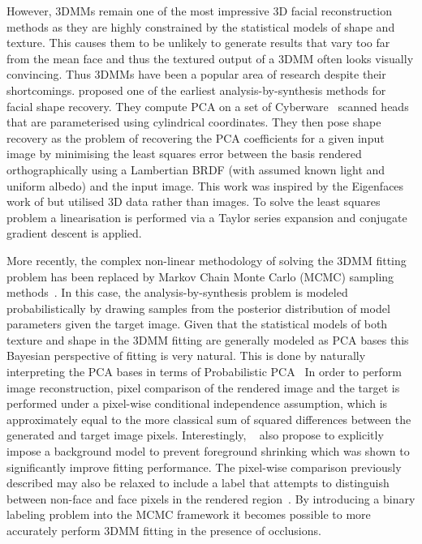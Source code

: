 However, 3DMMs remain one of the most impressive 3D facial reconstruction
methods as they are highly constrained by the statistical models
of shape and texture. This causes them to be unlikely to generate results
that vary too far from the mean face and thus the textured output of a 3DMM
often looks visually convincing. Thus 3DMMs have been a popular area of
research despite their shortcomings.
\cite{atick1996statistical} proposed one of the earliest analysis-by-synthesis
methods for facial shape recovery. They compute PCA on a set of
Cyberware~\cite{cyberware} scanned heads that are parameterised using
cylindrical coordinates. They then pose shape recovery as the problem
of recovering the PCA coefficients for a given input image by minimising
the least squares error between the basis rendered orthographically
using a Lambertian BRDF (with assumed known light and uniform albedo)
and the input image. This work was inspired by the Eigenfaces work of
\citet{Sirovich:1987te} but utilised 3D data rather than images. To solve
the least squares problem a linearisation is performed via a Taylor series
expansion and conjugate gradient descent is applied.

More recently, the complex non-linear methodology of solving the 3DMM fitting
problem has been replaced by Markov Chain Monte Carlo (MCMC) sampling
methods~\cite{schonborn2016markov,egger2016occlusion,schonborn2015background}.
In this case, the analysis-by-synthesis problem is modeled probabilistically
by drawing samples from the posterior distribution of model parameters given
the target image. Given that the statistical models of both texture and shape
in the 3DMM fitting are generally modeled as PCA bases this Bayesian
perspective of fitting is very natural. This is done by naturally interpreting
the PCA bases in terms of Probabilistic PCA~\cite{tipping1999probabilistic}
In order to perform image reconstruction,
pixel comparison of the rendered image and the target is performed under a pixel-wise
conditional independence assumption, which is approximately equal to the
more classical sum of squared differences between the generated and target
image pixels. Interestingly, ~\citet{schonborn2015background} also propose
to explicitly impose a background model to prevent foreground shrinking
which was shown to significantly improve fitting performance. The pixel-wise
comparison previously described may also be relaxed to include a label
that attempts to distinguish between non-face and face pixels in the rendered
region~\cite{egger2016occlusion}. By introducing a binary labeling problem
into the MCMC framework it becomes possible to more accurately
perform 3DMM fitting in the presence of occlusions.

